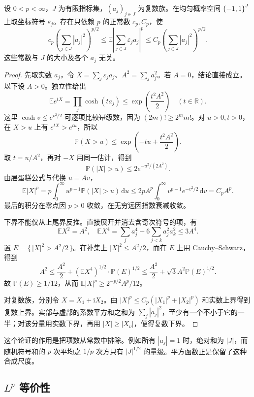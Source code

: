 \begin{lemma}[Khintchine 估计]\label{b2:lem:19-khintchine}
设 \(0<p<\infty\)，\(J\) 为有限指标集，\((a_j)_{j\in J}\) 为复数族。在均匀概率空间 \(\{-1,1\}^J\) 上取坐标符号 \(\varepsilon_j\)。存在只依赖 \(p\) 的正常数 \(c_p,C_p\)，使
\[
 c_p\left(\sum_{j\in J}|a_j|^2\right)^{p/2}
 \leq\mathbb E\left|\sum_{j\in J}\varepsilon_ja_j\right|^p
 \leq C_p\left(\sum_{j\in J}|a_j|^2\right)^{p/2}.
\]
这些常数与 \(J\) 的大小及各个 \(a_j\) 无关。
\end{lemma}
\begin{proof}
先取实数 \(a_j\)，令 \(X=\sum_j\varepsilon_ja_j\)、\(A^2=\sum_j a_j^2\)。若 \(A=0\)，结论直接成立。以下设 \(A>0\)。独立性给出
\[
 \mathbb E e^{tX}
 =\prod_j\cosh(ta_j)
 \leq\exp\left(\frac{t^2A^2}{2}\right)
 \quad(t\in\mathbb R).
\]
这里 \(\cosh v\leq e^{v^2/2}\) 可逐项比较幂级数，因为 \((2m)!\geq2^m m!\)。对 \(u>0,t>0\)，在 \(X>u\) 上有 \(e^{tX}>e^{tu}\)，所以
\[
 \mathbb P(X>u)
 \leq\exp\left(-tu+\frac{t^2A^2}{2}\right).
\]
取 \(t=u/A^2\)，再对 \(-X\) 用同一估计，得到
\[
 \mathbb P(|X|>u)\leq2e^{-u^2/(2A^2)}.
\]
由层蛋糕公式与代换 \(u=Av\)，
\[
 \mathbb E|X|^p
 =p\int_0^\infty u^{p-1}\mathbb P(|X|>u)\,\mathrm du
 \leq2pA^p\int_0^\infty v^{p-1}e^{-v^2/2}\,\mathrm dv
 =C_pA^p.
\]
最后的积分在零点因 \(p>0\) 收敛，在无穷远因指数衰减收敛。

下界不能仅从上尾界反推。直接展开并消去含奇次符号的项，有
\[
 \mathbb E X^2=A^2,
 \quad
 \mathbb E X^4
 =\sum_j a_j^4+6\sum_{j<k}a_j^2a_k^2
 \leq3A^4.
\]
置 \(E=\{\,|X|^2>A^2/2\,\}\)。在补集上 \(|X|^2\leq A^2/2\)，而在 \(E\) 上用 Cauchy--Schwarz，得到
\[
 A^2\leq\frac{A^2}{2}
       +(\mathbb E X^4)^{1/2}\cdot\mathbb P(E)^{1/2}
 \leq\frac{A^2}{2}+\sqrt3A^2\mathbb P(E)^{1/2}.
\]
故 \(\mathbb P(E)\geq1/12\)，从而
\(\mathbb E|X|^p\geq2^{-p/2}A^p/12\)。

对复数族，分别令 \(X=X_1+\mathrm iX_2\)。由
\(|X|^p\leq C_p(|X_1|^p+|X_2|^p)\)
和实数上界得到复数上界。实部与虚部的系数平方和之和为 \(\sum_j|a_j|^2\)，至少有一个不小于它的一半；对该分量用实数下界，再用 \(|X|\geq|X_\nu|\)，便得复数下界。
\end{proof}

这个论证的作用是把项数从常数中排除。例如所有 \(|a_j|=1\) 时，绝对和为 \(|J|\)，而随机符号和的 \(p\) 次平均之 \(1/p\) 次方只有 \(|J|^{1/2}\) 的量级。平方函数正是保留了这种合成尺度。

\subsection{\texorpdfstring{\(L^p\)}{Lp} 等价性}
\label{b2:subsec:190402}

